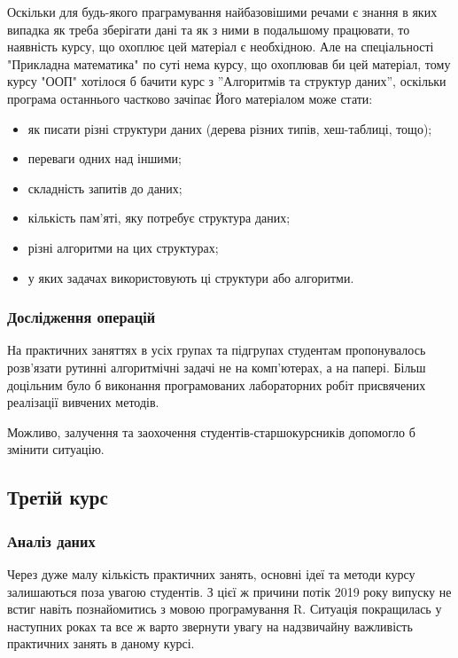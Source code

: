 \documentclass[14pt, a4paper]{extarticle}  %
\begin{document}
Оскільки для будь-якого праграмування найбазовішими речами є знання в яких випадка як треба зберігати дані та як з ними в подальшому працювати, то наявність курсу, що охоплює цей матеріал є необхідною. Але на спеціальності "Прикладна математика" по суті нема курсу, що охоплював би цей матеріал, тому курсу "ООП" хотілося б бачити курс з ''Алгоритмів та структур даних'', оскільки програма останнього частково зачіпає  Його матеріалом може стати: 
\begin{itemize}
    \item як писати різні структури даних (дерева різних типів, хеш-таблиці, тощо);
    \item переваги одних над іншими;
    \item складність запитів до даних; 
    \item кількість пам'яті, яку потребує структура даних; 
    \item різні алгоритми на цих структурах; 
    \item у яких задачах використовують ці структури або алгоритми.
\end{itemize}

\subsubsection{Дослідження операцій}

На практичних заняттях в усіх групах та підгрупах студентам пропонувалось розв'язати рутинні алгоритмічні задачі не на комп'ю\-терах, а на папері. Більш доцільним було б виконання програмованих лабораторних робіт присвячених реалізації вивчених методів. 

Можливо, залучення та заохочення студентів-старшокурсників допомогло б змінити ситуацію. 

\subsection{Третій курс}
\subsubsection{Аналіз даних}

Через дуже малу кількість практичних занять, основні ідеї та методи курсу залишаються поза увагою студентів. З цієї ж причини потік 2019 року випуску не встиг навіть познайомитись з мовою програмування R. Ситуація покращилась у наступних роках та все ж варто звернути увагу на надзвичайну важливість практичних занять в даному курсі. 
\end{document}
